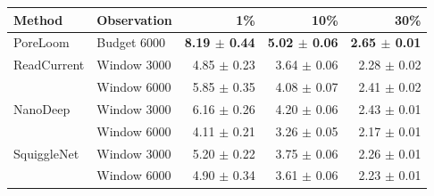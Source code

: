 \begingroup\setlength{\tabcolsep}{3.5pt}
\begin{tabular}{@{}llrrr@{}}
\toprule
Method & Observation & 1\% & 10\% & 30\%\\\midrule
PoreLoom & Budget 6000 & \textbf{8.19 $\pm$ 0.44} & \textbf{5.02 $\pm$ 0.06} & \textbf{2.65 $\pm$ 0.01}\\
ReadCurrent & Window 3000 & 4.85 $\pm$ 0.23 & 3.64 $\pm$ 0.06 & 2.28 $\pm$ 0.02\\
 & Window 6000 & 5.85 $\pm$ 0.35 & 4.08 $\pm$ 0.07 & 2.41 $\pm$ 0.02\\
NanoDeep & Window 3000 & 6.16 $\pm$ 0.26 & 4.20 $\pm$ 0.06 & 2.43 $\pm$ 0.01\\
 & Window 6000 & 4.11 $\pm$ 0.21 & 3.26 $\pm$ 0.05 & 2.17 $\pm$ 0.01\\
SquiggleNet & Window 3000 & 5.20 $\pm$ 0.22 & 3.75 $\pm$ 0.06 & 2.26 $\pm$ 0.01\\
 & Window 6000 & 4.90 $\pm$ 0.34 & 3.61 $\pm$ 0.06 & 2.23 $\pm$ 0.01\\
\bottomrule
\end{tabular}
\endgroup
